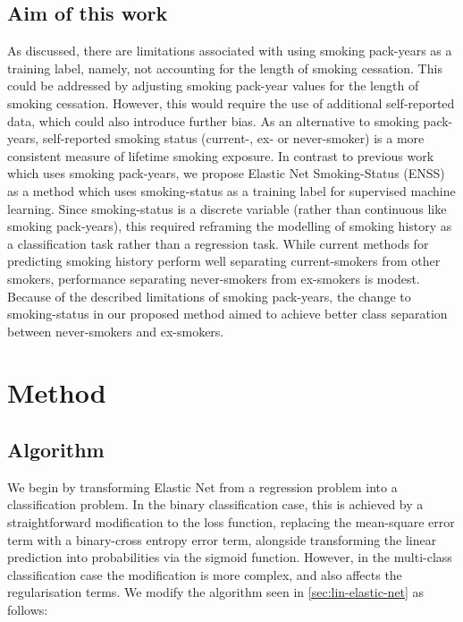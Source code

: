 \documentclass{article} %
\begin{document}
\subsection{Aim of this work}

As discussed, there are limitations associated with using smoking pack-years as a training label, namely, not accounting for the length of smoking cessation. This could be addressed by adjusting smoking pack-year values for the length of smoking cessation. However, this would require the use of additional self-reported data, which could also introduce further bias. As an alternative to smoking pack-years, self-reported smoking status (current-, ex- or never-smoker) is a more consistent measure of lifetime smoking exposure. In contrast to previous work which uses smoking pack-years, we propose Elastic Net Smoking-Status (ENSS) as a method which uses smoking-status as a training label for supervised machine learning.  Since smoking-status is a discrete variable (rather than continuous like smoking pack-years), this required reframing the modelling of smoking history as a classification task rather than a regression task. While current methods for predicting smoking history perform well separating current-smokers from other smokers, performance separating never-smokers from ex-smokers is modest. Because of the described limitations of smoking pack-years, the change to smoking-status in our proposed method aimed to achieve better class separation between never-smokers and ex-smokers.


\section{Method}

\subsection{Algorithm} \label{sec:algorithm}
We begin by transforming Elastic Net from a regression problem into a classification problem. In the binary classification case, this is achieved by a straightforward modification to the loss function, replacing the mean-square error term with a binary-cross entropy error term, alongside transforming the linear prediction into probabilities via the sigmoid function. However, in the multi-class classification case the modification is more complex, and also affects the regularisation terms. We modify the algorithm seen in \ref{sec:lin-elastic-net} as follows:
\end{document}
